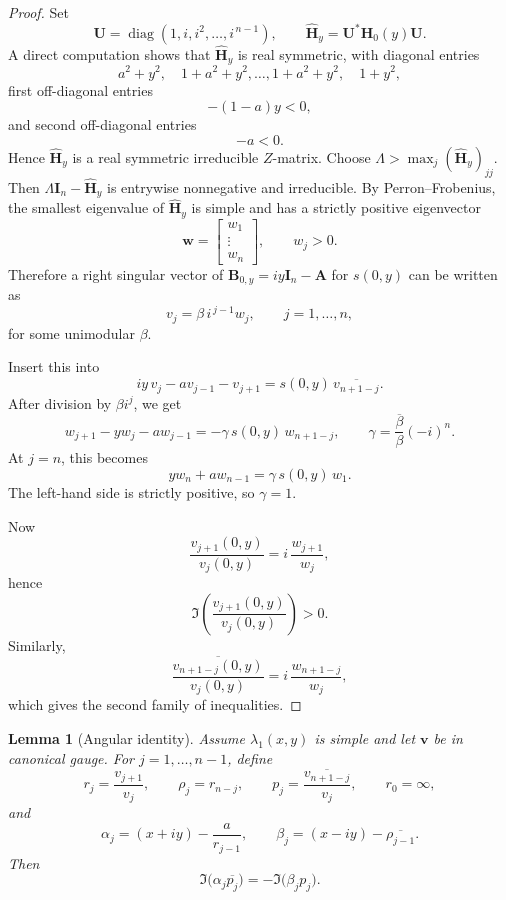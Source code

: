 \documentclass[11pt]{article}
\numberwithin{equation}{section}
\newtheorem{lemma}[theorem]{Lemma}
\newcommand{\A}{\mathbf A}
\newcommand{\I}{\mathbf I}
\newcommand{\Bmat}{\mathbf B}
\newcommand{\Hmat}{\mathbf H}
\newcommand{\diag}{\operatorname{diag}}
\begin{document}
\begin{proof}
Set
\[
\mathbf U=
\diag(1,i,i^2,\dots,i^{\,n-1}),
\qquad
\widehat{\Hmat}_y=\mathbf U^* \Hmat_0(y)\mathbf U.
\]
A direct computation shows that \(\widehat{\Hmat}_y\) is real symmetric, with diagonal
entries
\[
a^2+y^2,\quad 1+a^2+y^2,\dots,1+a^2+y^2,\quad 1+y^2,
\]
first off-diagonal entries
\[
-(1-a)y<0,
\]
and second off-diagonal entries
\[
-a<0.
\]
Hence \(\widehat{\Hmat}_y\) is a real symmetric irreducible \(Z\)-matrix.
Choose \(\Lambda>\max_j (\widehat{\Hmat}_y)_{jj}\).  Then
\(\Lambda \I_n-\widehat{\Hmat}_y\) is entrywise nonnegative and irreducible.  By
Perron--Frobenius, the smallest eigenvalue of \(\widehat{\Hmat}_y\) is simple and has a
strictly positive eigenvector
\[
\bm w=
\begin{bmatrix}
w_1\\
\vdots\\
w_n
\end{bmatrix},
\qquad
w_j>0.
\]
Therefore a right singular vector of \(\Bmat_{0,y}=iy\I_n-\A\) for \(s(0,y)\) can be
written as
\[
v_j=\beta\,i^{\,j-1}w_j,
\qquad
j=1,\dots,n,
\]
for some unimodular \(\beta\).

Insert this into
\[
iy\,v_j-av_{j-1}-v_{j+1}=s(0,y)\,\overline{v_{n+1-j}}.
\]
After division by \(\beta i^j\), we get
\[
w_{j+1}-yw_j-aw_{j-1}
=
-\gamma\,s(0,y)\,w_{n+1-j},
\qquad
\gamma=\frac{\overline\beta}{\beta}(-i)^n.
\]
At \(j=n\), this becomes
\[
yw_n+aw_{n-1}=\gamma\,s(0,y)\,w_1.
\]
The left-hand side is strictly positive, so \(\gamma=1\).

Now
\[
\frac{v_{j+1}(0,y)}{v_j(0,y)}
=
i\,\frac{w_{j+1}}{w_j},
\]
hence
\[
\Im\!\left(\frac{v_{j+1}(0,y)}{v_j(0,y)}\right)>0.
\]
Similarly,
\[
\frac{\overline{v_{n+1-j}(0,y)}}{v_j(0,y)}
=
i\,\frac{w_{n+1-j}}{w_j},
\]
which gives the second family of inequalities.
\end{proof}

\begin{lemma}[Angular identity]\label{lem:angular}
Assume \(\lambda_1(x,y)\) is simple and let \(\bm v\) be in canonical gauge.
For \(j=1,\dots,n-1\), define
\[
r_j=\frac{v_{j+1}}{v_j},
\qquad
\rho_j=r_{n-j},
\qquad
p_j=\frac{\overline{v_{n+1-j}}}{v_j},
\qquad
r_0=\infty,
\]
and
\[
\alpha_j=(x+iy)-\frac{a}{r_{j-1}},
\qquad
\beta_j=(x-iy)-\overline{\rho_{j-1}}.
\]
Then
\[
\Im\!\bigl(\alpha_j\overline{p_j}\bigr)
=
-\Im\!\bigl(\beta_j p_j\bigr).
\]
\end{lemma}
\end{document}
